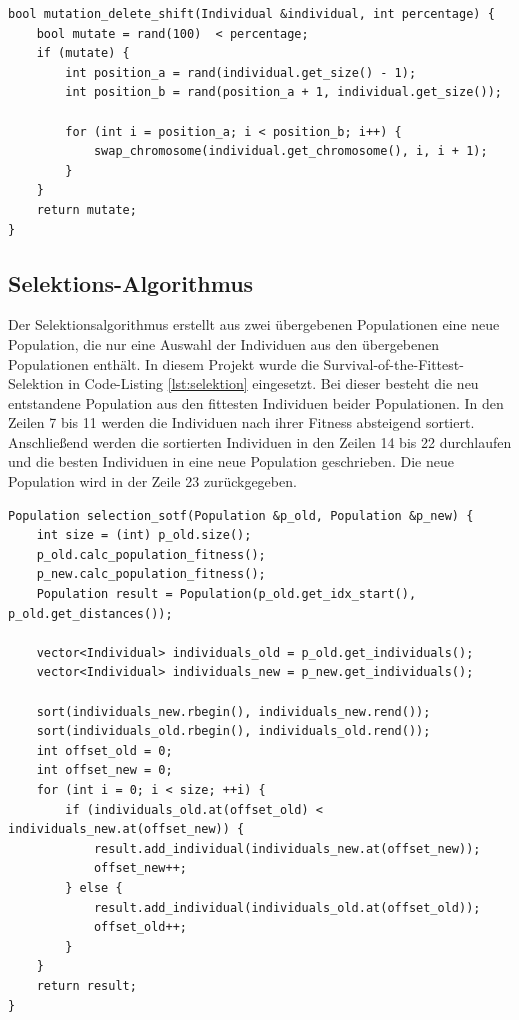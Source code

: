 \begin{minipage}[!htb]{\linewidth}
\begin{lstlisting}[caption={Delete-Shift-Mutaions-Algorithmus}, firstnumber=1, captionpos=b, label=lst:mutation]
bool mutation_delete_shift(Individual &individual, int percentage) {
	bool mutate = rand(100)  < percentage;
	if (mutate) {
		int position_a = rand(individual.get_size() - 1);
		int position_b = rand(position_a + 1, individual.get_size());
 
		for (int i = position_a; i < position_b; i++) {
			swap_chromosome(individual.get_chromosome(), i, i + 1);
		}
	}
	return mutate;
}
\end{lstlisting}
\end{minipage}
\subsection{Selektions-Algorithmus}
Der Selektionsalgorithmus erstellt aus zwei übergebenen Populationen eine neue Population, die nur eine Auswahl der Individuen aus den übergebenen Populationen enthält.
In diesem Projekt wurde die Survival-of-the-Fittest-Selektion in Code-Listing \ref{lst:selektion} eingesetzt. Bei dieser besteht die neu entstandene Population aus den fittesten Individuen beider Populationen.
In den Zeilen 7 bis 11 werden die Individuen nach ihrer Fitness absteigend sortiert. Anschließend werden die sortierten Individuen in den Zeilen 14 bis 22 durchlaufen und die besten Individuen in eine neue Population geschrieben. Die neue Population wird in der Zeile 23 zurückgegeben.

\begin{minipage}[!htb]{\linewidth}
\begin{lstlisting}[caption={Survival-Of-The-Fittest-Selektions-Algorithmus}, firstnumber=1, captionpos=b, label=lst:selektion]
Population selection_sotf(Population &p_old, Population &p_new) {
	int size = (int) p_old.size();
	p_old.calc_population_fitness();
	p_new.calc_population_fitness();
	Population result = Population(p_old.get_idx_start(), p_old.get_distances());

	vector<Individual> individuals_old = p_old.get_individuals();
	vector<Individual> individuals_new = p_new.get_individuals();

	sort(individuals_new.rbegin(), individuals_new.rend());
	sort(individuals_old.rbegin(), individuals_old.rend());
	int offset_old = 0;
	int offset_new = 0;
	for (int i = 0; i < size; ++i) {
		if (individuals_old.at(offset_old) < individuals_new.at(offset_new)) {
			result.add_individual(individuals_new.at(offset_new));
			offset_new++;
		} else {
			result.add_individual(individuals_old.at(offset_old));
 			offset_old++;
		}
	}
	return result;
}
\end{lstlisting}
\end{minipage}
